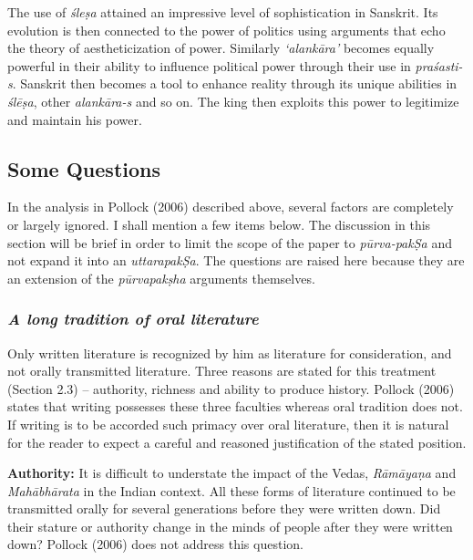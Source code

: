 The use of {\sl śleṣa} attained an impressive level of sophistication in Sanskrit. Its evolution is then connected to the power of politics using arguments that echo the theory of aestheticization of power. Similarly {\sl `alankāra'} becomes equally powerful in their ability to influence political power through their use in {\sl praśasti-s}. Sanskrit then becomes a tool to enhance reality through its unique abilities in {\sl ślēṣa}, other {\sl alankāra-s} and so on. The king then exploits this power to legitimize and maintain his power.

\subsection{Some Questions}

In the analysis in Pollock (2006) described above, several factors are completely or largely ignored. I shall mention a few items below. The discussion in this section will be brief in order to limit the scope of the paper to {\sl pūrva-pakṢa} and not expand it into an {\sl uttarapakṢa}. The questions are raised here because they are an extension of the {\sl pūrvapakṣha} arguments themselves. 

\subsubsection{{\sl A long tradition of oral literature}}

Only written literature is recognized by him as literature for consideration, and not orally transmitted literature. Three reasons are stated for this treatment (Section 2.3) – authority, richness and ability to produce history. Pollock (2006) states that writing possesses these three faculties whereas oral tradition does not. If writing is to be accorded such primacy over oral literature, then it is natural for the reader to expect a careful and reasoned justification of the stated position.

{\bf Authority:} It is difficult to understate the impact of the Vedas, {\sl Rāmāyaṇa} and {\sl Mahābhārata} in the Indian context. All these forms of literature continued to be transmitted orally for several generations before they were written down. Did their stature or authority change in the minds of people after they were written down?  Pollock (2006) does not address this question.

